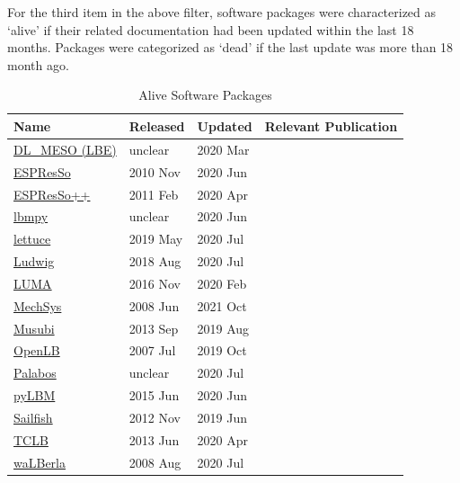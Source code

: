 \documentclass[final, 3p, times, authoryear]{elsarticle}
\begin{document}
For the third item in the above filter, software packages were characterized as
`alive' if their related documentation had been updated within the last 18
months. Packages were categorized as `dead' if the last update was more than 18
month ago.

\begin{table}
	\begin{center}
		\begin{tabular}{ p{3cm}p{2cm}p{2cm}p{5.5cm} }
			\toprule
			Name & Released & Updated & Relevant Publication\\
			\midrule
			\href{https://www.ccp5.ac.uk/sites/www.ccp5.ac.uk/files/dl_meso/data/dl_meso_2.7.zip}{DL\_MESO (LBE)} & unclear & 2020 Mar&\citep{seaton2013dlmeso}\\
			\href{https://github.com/espressomd/espresso}{ESPResSo} & 2010 Nov & 2020 Jun&\citep{weik2019espresso}\\
			\href{https://github.com/espressopp/espressopp}{ESPResSo++} & 2011 Feb & 2020 Apr&\citep{halverson2013espresso++}\\
			\href{https://github.com/mabau/lbmpy}{lbmpy}& unclear  & 2020 Jun & \citep{bauer2021lbmpy}\\
			\href{https://github.com/Olllom/lettuce}{lettuce} & 2019 May & 2020 Jul&\citep{bedrunka2021lettuce}\\
			\href{https://github.com/ludwig-cf/ludwig}{Ludwig} & 2018 Aug & 2020 Jul&\citep{desplat2001ludwig}\\
			\href{https://github.com/aharwood2/LUMA}{LUMA} & 2016 Nov   & 2020 Feb &\citep{harwood2018luma}\\
			\href{http://hg.savannah.gnu.org/hgweb/mechsys/file/tip/}{MechSys} & 2008 Jun    & 2021 Oct &\citep{galindo2013coupled}\\
			\href{https://osdn.net/projects/apes/scm/hg/musubi/}{Musubi} & 2013 Sep & 2019 Aug &\citep{hasert2014complex}\\
			\href{https://www.openlb.net/download/}{OpenLB} & 2007 Jul & 2019 Oct &\citep{heuveline2010openlb}\\
			\href{https://gitlab.com/unigespc/palabos}{Palabos} & unclear & 2020 Jul &\citep{latt2021palabos}\\
			\href{https://github.com/pylbm/pylbm}{pyLBM} & 2015 Jun&   2020 Jun &\\
			\href{https://github.com/sailfish-team/sailfish}{Sailfish} & 2012 Nov & 2019 Jun & \citep{januszewski2014sailfish}\\
			\href{https://github.com/CFD-GO/TCLB}{TCLB} & 2013 Jun  & 2020 Apr & \citep{rokicki2016adjoint}\\
			\href{https://i10git.cs.fau.de/walberla/walberla}{waLBerla} & 2008 Aug & 2020 Jul & \citep{bauer2021walberla}\\
			\bottomrule
		\end{tabular}
		\caption{Alive Software Packages} \label{alivepackages}
	\end{center}
\end{table}
\end{document}
